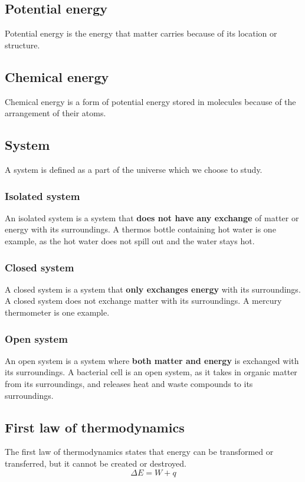 \documentclass[11pt]{article}
\begin{document}
\subsection{Potential energy}
\label{sec:org0e8ebe1}
Potential energy is the energy that matter carries because of its location or structure.
\subsection{Chemical energy}
\label{sec:org942fe30}
Chemical energy is a form of potential energy stored in molecules because of the arrangement of their atoms.
\subsection{System}
\label{sec:org83e1c13}
A system is defined as a part of the universe which we choose to study.
\subsubsection{Isolated system}
\label{sec:org5ed6a58}
An isolated system is a system that \textbf{does not have any exchange} of matter or energy with its surroundings. A thermos bottle containing hot water is one example, as the hot water does not spill out and the water stays hot.
\subsubsection{Closed system}
\label{sec:orgb7e7f55}
A closed system is a system that \textbf{only exchanges energy} with its surroundings. A closed system does not exchange matter with its surroundings. A mercury thermometer is one example.
\subsubsection{Open system}
\label{sec:org1745a75}
An open system is a system where \textbf{both matter and energy} is exchanged with its surroundings. A bacterial cell is an open system, as it takes in organic matter from its surroundings, and releases heat and waste compounds to its surroundings.

\newpage
\subsection{First law of thermodynamics}
\label{sec:orgf62b269}
The first law of thermodynamics states that energy can be transformed or transferred, but it cannot be created or destroyed.
\[\Delta E = W + q\]
\end{document}
